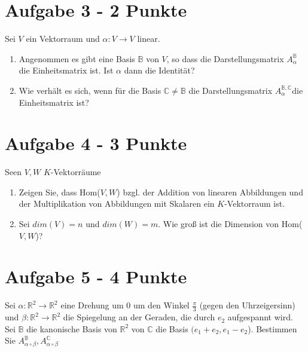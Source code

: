\documentclass[a4paper]{article}
\begin{document}
\section*{Aufgabe 3 - 2 Punkte}
Sei $V$ ein Vektorraum und $\alpha: V \rightarrow V$ linear.
  \begin{enumerate}[label=(\alph*)]
\item Angenommen es gibt eine Basis $\mathbb{B}$ von $V$, so dass die Darstellungsmatrix $A^{\mathbb{B}}_{\alpha}$ die Einheitsmatrix ist. Ist $\alpha$ dann die Identität?
\item Wie verhält es sich, wenn für die Basis $\mathbb{C} \neq \mathbb{B}$ die Darstellungsmatrix $A^{\mathbb{B},\mathbb{C}}_{\alpha}$die Einheitsmatrix ist?
 \end{enumerate}


\section*{Aufgabe 4 - 3 Punkte}
Seen $V,W$ $K$-Vektorräume

  \begin{enumerate}[label=(\alph*)]
  \item Zeigen Sie, dass Hom($V,W$) bzgl. der Addition von linearen Abbildungen und der Multiplikation von Abbildungen mit Skalaren ein $K$-Vektorraum ist.
  \item Sei $dim(V) = n$ und $dim(W) = m$. Wie groß ist die Dimension von Hom($V,W$)?
  
  \end{enumerate}
 
 \section*{Aufgabe 5 - 4 Punkte}
Sei $\alpha: \mathbb{R}^2 \rightarrow \mathbb{R}^2$ eine Drehung um 0 um den Winkel $\frac{\pi}{3}$ (gegen den Uhrzeigersinn) und $\beta: \mathbb{R}^2 \rightarrow \mathbb{R}^2$ die Spiegelung an der Geraden, die durch $e_2$ aufgespannt wird. Sei $\mathbb{B}$ die kanonische Basis von $\mathbb{R}^2$ von $\mathbb{C}$ die Basis $(e_1 + e_2, e_1 - e_2$). Bestimmen Sie $A^{\mathbb{B}}_{\alpha \circ \beta}, A^{\mathbb{C}}_{\alpha \circ \beta}$
\end{document}
